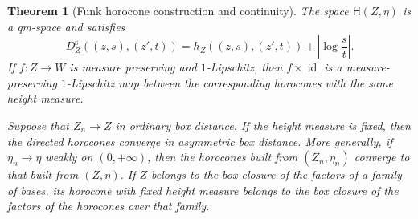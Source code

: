 \documentclass[10pt,a4paper]{amsart}
\numberwithin{equation}{section}
\newtheorem{theorem}{Theorem}[section]
\begin{document}
\begin{theorem}[Funk horocone construction and continuity]\label{thm:general-horocone}
The space $\mathsf H(Z,\eta)$ is a qm-space and satisfies
\begin{equation}\label{eq:general-horocone-symmetrization} D_Z^{\mathrm s}((z,s),(z',t)) =h_Z((z,s),(z',t))+\left|\log\frac{s}{t}\right|. \end{equation}
If $f\colon Z\to W$ is measure preserving and $1$-Lipschitz, then $f\times\operatorname{id}$ is a measure-preserving $1$-Lipschitz map between the corresponding horocones with the same height measure.

Suppose that $Z_n\to Z$ in ordinary box distance.  If the height measure is fixed, then the directed horocones converge in asymmetric box distance.  More generally, if $\eta_n\longrightarrow\eta$ weakly on $(0,+\infty)$, then the horocones built from $(Z_n,\eta_n)$ converge to that built from $(Z,\eta)$.  If $Z$ belongs to the box closure of the factors of a family of bases, its horocone with fixed height measure belongs to the box closure of the factors of the horocones over that family.
\end{theorem}
\end{document}
